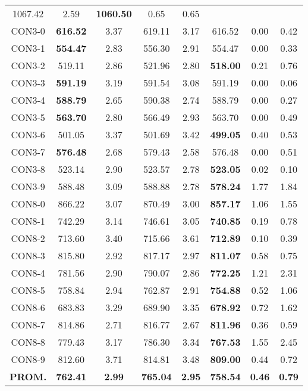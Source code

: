\begin{table}[h]
\begin{tabular}{c c c c c c c c}
1067.42 & 2.59 & \bf{1060.50} & 
0.65 & 0.65\\CON3-0 & \bf{616.52} & 3.37 & 
619.11 & 3.17 & 616.52 & 0.00
 & 0.42\\CON3-1 & \bf{554.47} & 2.83 & 
556.30 & 2.91 & 554.47 & 0.00
 & 0.33\\CON3-2 & 519.11 & 2.86 & 
521.96 & 2.80 & \bf{518.00} & 
0.21 & 0.76\\CON3-3 & \bf{591.19} & 3.19 & 
591.54 & 3.08 & 591.19 & 0.00
 & 0.06\\CON3-4 & \bf{588.79} & 2.65 & 
590.38 & 2.74 & 588.79 & 0.00
 & 0.27\\CON3-5 & \bf{563.70} & 2.80 & 
566.49 & 2.93 & 563.70 & 0.00
 & 0.49\\CON3-6 & 501.05 & 3.37 & 
501.69 & 3.42 & \bf{499.05} & 
0.40 & 0.53\\CON3-7 & \bf{576.48} & 2.68 & 
579.43 & 2.58 & 576.48 & 0.00
 & 0.51\\CON3-8 & 523.14 & 2.90 & 
523.57 & 2.78 & \bf{523.05} & 
0.02 & 0.10\\CON3-9 & 588.48 & 3.09 & 
588.88 & 2.78 & \bf{578.24} & 
1.77 & 1.84\\CON8-0 & 866.22 & 3.07 & 
870.49 & 3.00 & \bf{857.17} & 
1.06 & 1.55\\CON8-1 & 742.29 & 3.14 & 
746.61 & 3.05 & \bf{740.85} & 
0.19 & 0.78\\CON8-2 & 713.60 & 3.40 & 
715.66 & 3.61 & \bf{712.89} & 
0.10 & 0.39\\CON8-3 & 815.80 & 2.92 & 
817.17 & 2.97 & \bf{811.07} & 
0.58 & 0.75\\CON8-4 & 781.56 & 2.90 & 
790.07 & 2.86 & \bf{772.25} & 
1.21 & 2.31\\CON8-5 & 758.84 & 2.94 & 
762.87 & 2.91 & \bf{754.88} & 
0.52 & 1.06\\CON8-6 & 683.83 & 3.29 & 
689.90 & 3.35 & \bf{678.92} & 
0.72 & 1.62\\CON8-7 & 814.86 & 2.71 & 
816.77 & 2.67 & \bf{811.96} & 
0.36 & 0.59\\CON8-8 & 779.43 & 3.17 & 
786.30 & 3.34 & \bf{767.53} & 
1.55 & 2.45\\CON8-9 & 812.60 & 3.71 & 
814.81 & 3.48 & \bf{809.00} & 
0.44 & 0.72\\\bf{PROM.} & 
\bf{762.41} & \bf{2.99} & \bf{765.04} & \bf{2.95} & \bf{758.54} & \bf{0.46} & \bf{0.79}\\[1ex]\hline
\end{tabular}
\label{table:nonlin}
\end{table}
